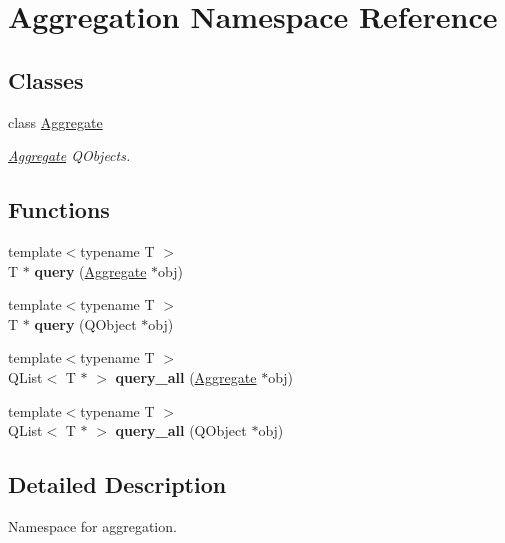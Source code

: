 \hypertarget{namespaceAggregation}{}\section{Aggregation Namespace Reference}
\label{namespaceAggregation}
\subsection*{Classes}
\begin{DoxyCompactItemize}
\item 
class \hyperlink{classAggregation_1_1Aggregate}{Aggregate}
\begin{DoxyCompactList}\small\item\em \hyperlink{classAggregation_1_1Aggregate}{Aggregate} Q\+Objects. \end{DoxyCompactList}\end{DoxyCompactItemize}
\subsection*{Functions}
\begin{DoxyCompactItemize}
\item 
{\footnotesize template$<$typename T $>$ }\\T $\ast$ {\bfseries query} (\hyperlink{classAggregation_1_1Aggregate}{Aggregate} $\ast$obj)\hypertarget{namespaceAggregation_a5974e4c9d1b8a379276188f9da70cb1d}{}\label{namespaceAggregation_a5974e4c9d1b8a379276188f9da70cb1d}

\item 
{\footnotesize template$<$typename T $>$ }\\T $\ast$ {\bfseries query} (Q\+Object $\ast$obj)\hypertarget{namespaceAggregation_ad92024df426e336ab0a3e52683eaf346}{}\label{namespaceAggregation_ad92024df426e336ab0a3e52683eaf346}

\item 
{\footnotesize template$<$typename T $>$ }\\Q\+List$<$ T $\ast$ $>$ {\bfseries query\+\_\+all} (\hyperlink{classAggregation_1_1Aggregate}{Aggregate} $\ast$obj)\hypertarget{namespaceAggregation_a1e244cb5762aab9059c76b49802c1878}{}\label{namespaceAggregation_a1e244cb5762aab9059c76b49802c1878}

\item 
{\footnotesize template$<$typename T $>$ }\\Q\+List$<$ T $\ast$ $>$ {\bfseries query\+\_\+all} (Q\+Object $\ast$obj)\hypertarget{namespaceAggregation_a85966ec6218e2acb334634407d87f563}{}\label{namespaceAggregation_a85966ec6218e2acb334634407d87f563}

\end{DoxyCompactItemize}


\subsection{Detailed Description}
Namespace for aggregation. 